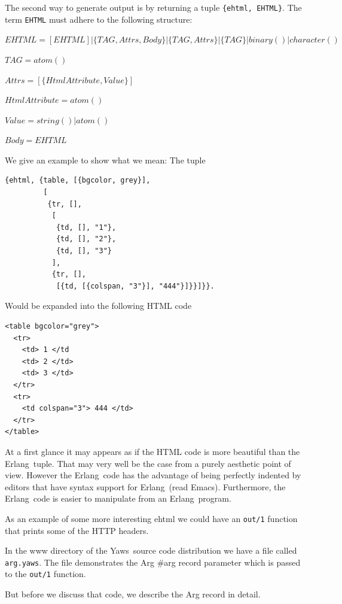 \documentclass[11pt,oneside,english]{book}
\newcommand{\Erlang}            %
        {{\sc Erlang}}
\newcommand{\Yaws}            %
        {{\sc Yaws}}
\begin{document}
The second way to generate output is by returning a tuple
\verb+{ehtml, EHTML}+. The term \verb+EHTML+ must adhere to the
following structure:

$EHTML = [EHTML] | \{TAG, Attrs, Body\} |
                   \{TAG, Attrs\} | \{TAG\} |
        binary() | character()$

$TAG         = atom()$

$Attrs = [\{HtmlAttribute, Value\}]$

$HtmlAttribute   = atom()$

$Value = string() | atom()$

$Body  = EHTML$

We give an example to show what we mean:
The tuple
\begin{verbatim}
{ehtml, {table, [{bgcolor, grey}],
         [
          {tr, [],
           [
            {td, [], "1"},
            {td, [], "2"},
            {td, [], "3"}
           ],
           {tr, [],
            [{td, [{colspan, "3"}], "444"}]}}]}}.
\end{verbatim}

Would be expanded into the following HTML code
\begin{verbatim}
<table bgcolor="grey">
  <tr>
    <td> 1 </td
    <td> 2 </td>
    <td> 3 </td>
  </tr>
  <tr>
    <td colspan="3"> 444 </td>
  </tr>
</table>

\end{verbatim}

At a first glance it may appears as if the HTML code is more
beautiful than the \Erlang\  tuple. That may very well be the
case from a purely aesthetic point of view. However the
\Erlang\  code has the advantage of being perfectly indented by editors
that have syntax support for \Erlang\  (read Emacs). Furthermore, the \Erlang\
code is easier to manipulate from an \Erlang\  program.

As an example of some more interesting ehtml we could have
an \verb+out/1+ function that prints some of the HTTP headers.

In the www directory of the \Yaws\  source code distribution we have
a file called \verb+arg.yaws+. The file demonstrates the Arg \#arg record
parameter which is passed to the \verb+out/1+ function.


But before we discuss that code, we describe the Arg record
in detail.
\end{document}
